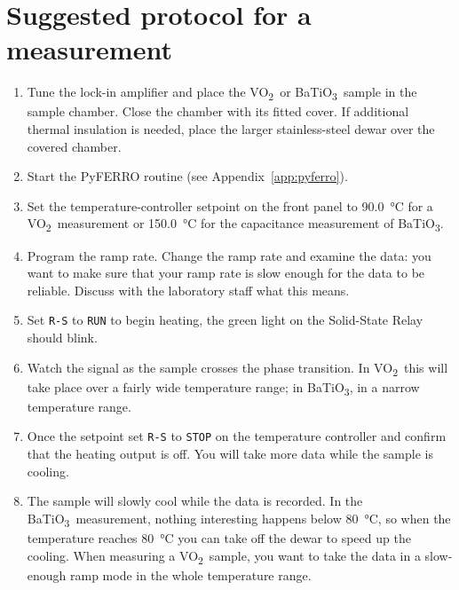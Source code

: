\documentclass[11pt,a4paper]{article}
\newcommand{\VOtwo}{VO\textsubscript{2}}
\newcommand{\BTO}{BaTiO\textsubscript{3}}
\begin{document}
\section{Suggested protocol for a measurement}

\begin{enumerate}
  \item Tune the lock-in amplifier and place the \VOtwo\ or \BTO\ sample
        in the sample chamber. Close the chamber with its fitted cover. If
        additional thermal insulation is needed, place the larger stainless-steel
        dewar over the covered chamber.
  \item Start the PyFERRO routine (see Appendix~\ref{app:pyferro}).
  \item Set the temperature-controller setpoint on the front panel to
  \SI{90.0}{\degreeCelsius} for a \VOtwo\ measurement or
  \SI{150.0}{\degreeCelsius} for the capacitance measurement of \BTO.
  \item Program the ramp rate. Change the ramp rate and examine the data: you
        want to make sure that your ramp rate is slow enough for the data to be
        reliable. Discuss with the laboratory staff what this means.
  \item Set \texttt{R-S} to \texttt{RUN} to begin heating, the green light on the Solid-State Relay should blink.
  \item Watch the signal as the sample crosses the phase transition. In \VOtwo\
        this will take place over a fairly wide temperature range; in \BTO, in
        a narrow temperature range.
  \item Once the setpoint set \texttt{R-S} to \texttt{STOP} on the temperature controller and
        confirm that the heating output is off. You will take more data while the sample is
        cooling.
  \item The sample will slowly cool while the data is recorded. In the \BTO\
        measurement, nothing interesting happens below \SI{80}{\degreeCelsius},
        so when the temperature reaches \SI{80}{\degreeCelsius} you can take off
        the dewar to speed up the cooling. When measuring a \VOtwo\ sample, you
        want to take the data in a slow-enough ramp mode in the whole
        temperature range.
\end{enumerate}

\end{document}
